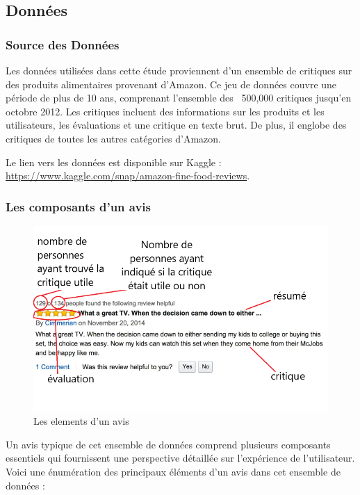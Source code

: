 

\subsection{Données}

\subsubsection{Source des Données}

Les données utilisées dans cette étude proviennent d'un ensemble de critiques sur des produits alimentaires provenant d'Amazon. Ce jeu de données couvre une période de plus de 10 ans, comprenant l'ensemble des ~500,000 critiques jusqu'en octobre 2012. Les critiques incluent des informations sur les produits et les utilisateurs, les évaluations et une critique en texte brut. De plus, il englobe des critiques de toutes les autres catégories d'Amazon.

Le lien vers les données est disponible sur Kaggle :  \url{https://www.kaggle.com/snap/amazon-fine-food-reviews}.

\subsubsection{Les composants d'un avis}
\begin{figure}[h]
    \centering
    \includegraphics[scale=0.4]{assets/amazonReviewDetails.png}
    \caption{Les elements d'un avis}
    \label{fig:avis}
\end{figure}

Un avis typique de cet ensemble de données comprend plusieurs composants essentiels qui fournissent une perspective détaillée sur l'expérience de l'utilisateur. Voici une énumération des principaux éléments d'un avis dans cet ensemble de données :

